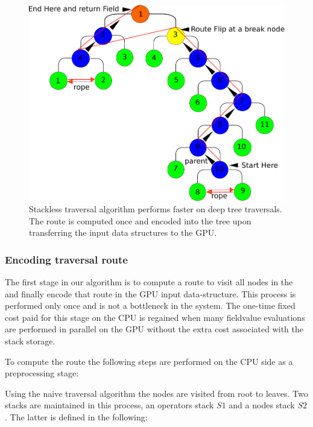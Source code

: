 \begin{figure}[H]
  \centering
  \includegraphics[width=1.0\linewidth]{figures/gpupoly/stackless.pdf}
  \caption{\label{fig:stackless}
  {Stackless \blob traversal algorithm performs faster on deep tree traversals. The route is computed once and encoded into the tree upon transferring the input 
  data structures to the GPU.}
}
\end{figure}

\subsubsection{Encoding traversal route}
The first stage in our algorithm is to compute a route to visit all nodes in the \blob 
and finally encode that route in the GPU input data-structure. This process is performed only once and is not a 
bottleneck in the system. The one-time fixed cost paid for this stage on the CPU is regained 
when many fieldvalue evaluations are performed in parallel on the GPU without the extra cost 
associated with the stack storage.

To compute the route the following steps are performed on the CPU side as a preprocessing stage: 

Using the naive \blob traversal algorithm the nodes are visited from root to leaves. Two stacks are maintained in this process, an
operators stack $S1$ and a  nodes stack $S2$. The latter is defined in the following:

